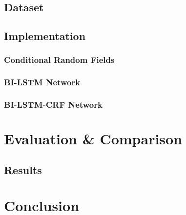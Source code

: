 \documentclass[12pt]{book}
\begin{document}
	\section{Dataset}
	
	\section{Implementation}
	
	\subsection{Conditional Random Fields}
	
	\subsection{BI-LSTM Network}
	
	\subsection{BI-LSTM-CRF Network}

	\chapter{Evaluation \& Comparison}
	
	\section{Results}

	\chapter{Conclusion}
	
	
	
\end{document}
